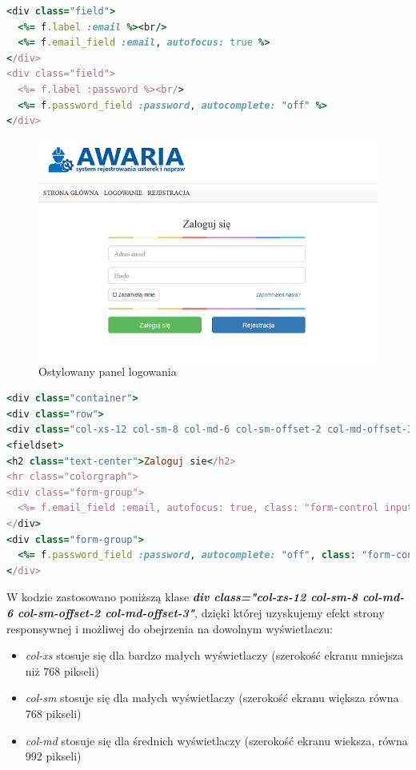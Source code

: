 \documentclass[openright]{xmgr}
\begin{document}
	\newpage
	\begin{lstlisting}[language=Ruby,lineskip={-1pt},caption=Kod odpowiedzialny za panel logowania]
<div class="field">
  <%= f.label :email %><br/>
  <%= f.email_field :email, autofocus: true %>
</div>
<div class="field">
  <%= f.label :password %><br/>
  <%= f.password_field :password, autocomplete: "off" %>
</div>
	\end{lstlisting}
	
	\begin{figure}[!tbh]
		\centering
		\includegraphics[width=\linewidth]{image/panelhtml}
		\caption{Ostylowany panel logowania}
	\end{figure}
\newpage
	\begin{lstlisting}[language=Ruby,lineskip={-1pt},caption= Kod obudowany kodem HTML]
<div class="container">
<div class="row">
<div class="col-xs-12 col-sm-8 col-md-6 col-sm-offset-2 col-md-offset-3">
<fieldset>
<h2 class="text-center">Zaloguj sie</h2>
<hr class="colorgraph">
<div class="form-group">
  <%= f.email_field :email, autofocus: true, class: "form-control input-lg", placeholder: "Adres email" %>
</div>
<div class="form-group">
  <%= f.password_field :password, autocomplete: "off", class: "form-control input-lg", placeholder: "Haslo"  %>
</div>
	\end{lstlisting}

W kodzie zastosowano poniższą klase \textbf{\textit{div class="col-xs-12 col-sm-8 col-md-6 col-sm-offset-2 col-md-offset-3"}}, dzięki której uzyskujemy efekt strony responsywnej \cite{css} i możliwej do obejrzenia na dowolnym wyświetlaczu:
\begin{itemize}
	\item
\textit{col-xs} stosuje się dla bardzo małych wyświetlaczy (szerokość ekranu mniejsza niż 768 pikseli)
\item
\textit{col-sm} stosuje się dla małych wyświetlaczy (szerokość ekranu większa równa 768 pikseli)
\item
\textit{col-md} stosuje się dla średnich wyświetlaczy (szerokość ekranu wieksza, równa 992 pikseli)\\
\end{itemize}
\end{document}

